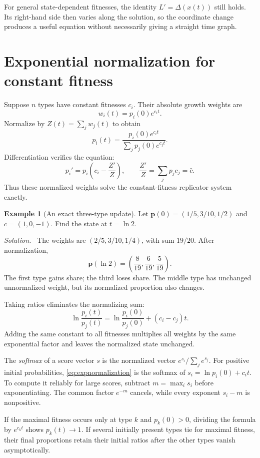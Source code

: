 \documentclass[11pt,oneside,openany]{book}
\theoremstyle{definition}
\newtheorem{example}{Example}[chapter]
\theoremstyle{remark}
\newenvironment{solution}{\par\smallskip\noindent\textit{Solution.}\ }{\par\smallskip}
\newcommand{\p}{\mathbf{p}}
\numberwithin{equation}{chapter}
\begin{document}
For general state-dependent fitnesses, the identity $L'=\Delta(x(t))$ still holds. Its right-hand side then varies along the solution, so the coordinate change produces a useful equation without necessarily giving a straight time graph.

\section{Exponential normalization for constant fitness}
Suppose $n$ types have constant fitnesses $c_i$. Their absolute growth weights are
\[
w_i(t)=p_i(0)e^{c_it}.
\]
Normalize by $Z(t)=\sum_jw_j(t)$ to obtain
\begin{equation}\label{eq:expnormalization}
\boxed{p_i(t)=\frac{p_i(0)e^{c_it}}{\sum_jp_j(0)e^{c_jt}}.}
\end{equation}
Differentiation verifies the equation:
\[
p_i'=p_i\left(c_i-\frac{Z'}Z\right),\qquad
\frac{Z'}Z=\sum_jp_jc_j=\bar c.
\]
Thus these normalized weights solve the constant-fitness replicator system exactly.

\begin{example}[An exact three-type update]
Let $\p(0)=(1/5,3/10,1/2)$ and $c=(1,0,-1)$. Find the state at $t=\ln2$.
\begin{solution}
The weights are $(2/5,3/10,1/4)$, with sum $19/20$. After normalization,
\[
\p(\ln2)=\left(\frac8{19},\frac6{19},\frac5{19}\right).
\]
The first type gains share; the third loses share. The middle type has unchanged unnormalized weight, but its normalized proportion also changes.
\end{solution}
\end{example}

Taking ratios eliminates the normalizing sum:
\[
\ln\frac{p_i(t)}{p_j(t)}=\ln\frac{p_i(0)}{p_j(0)}+(c_i-c_j)t.
\]
Adding the same constant to all fitnesses multiplies all weights by the same exponential factor and leaves the normalized state unchanged.

The \emph{softmax} of a score vector $s$ is the normalized vector $e^{s_i}/\sum_je^{s_j}$. For positive initial probabilities, \eqref{eq:expnormalization} is the softmax of $s_i=\ln p_i(0)+c_it$. To compute it reliably for large scores, subtract $m=\max_i s_i$ before exponentiating. The common factor $e^{-m}$ cancels, while every exponent $s_i-m$ is nonpositive.

If the maximal fitness occurs only at type $k$ and $p_k(0)>0$, dividing the formula by $e^{c_kt}$ shows $p_k(t)\to1$. If several initially present types tie for maximal fitness, their final proportions retain their initial ratios after the other types vanish asymptotically.
\end{document}
